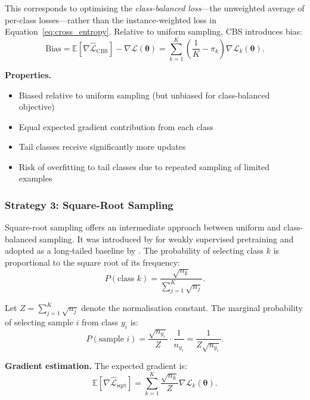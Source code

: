 \documentclass[12pt,a4paper]{article}
\newcommand{\E}{\mathbb{E}}
\newcommand{\btheta}{\boldsymbol{\theta}}
\begin{document}
This corresponds to optimising the \textit{class-balanced loss}---the unweighted average of per-class losses---rather than the instance-weighted loss in Equation~\eqref{eq:cross_entropy}. Relative to uniform sampling, CBS introduces bias:
\begin{equation}
    \text{Bias} = \E[\nabla \hat{\mathcal{L}}_{\text{CBS}}] - \nabla \mathcal{L}(\btheta) = \sum_{k=1}^{K} \left( \frac{1}{K} - \pi_k \right) \nabla \mathcal{L}_k(\btheta).
    \label{eq:cbs_bias}
\end{equation}

\textbf{Properties.}
\begin{itemize}[leftmargin=*]
    \item Biased relative to uniform sampling (but unbiased for class-balanced objective)
    \item Equal expected gradient contribution from each class
    \item Tail classes receive significantly more updates
    \item Risk of overfitting to tail classes due to repeated sampling of limited examples
\end{itemize}


\subsubsection{Strategy 3: Square-Root Sampling}
\label{subsec:sqrt_sampling}
Square-root sampling offers an intermediate approach between uniform and class-balanced sampling. It was introduced by \citet{mahajan2018exploring} for weakly supervised pretraining and adopted as a long-tailed baseline by \citet{kang2020decoupling}. The probability of selecting class $k$ is proportional to the square root of its frequency:
\begin{equation}
    P(\text{class } k) = \frac{\sqrt{n_k}}{\sum_{j=1}^{K} \sqrt{n_j}}.
    \label{eq:sqrt_class_prob}
\end{equation}

Let $Z = \sum_{j=1}^{K} \sqrt{n_j}$ denote the normalisation constant. The marginal probability of selecting sample $i$ from class $y_i$ is:
\begin{equation}
    P(\text{sample } i) = \frac{\sqrt{n_{y_i}}}{Z} \cdot \frac{1}{n_{y_i}} = \frac{1}{Z \sqrt{n_{y_i}}}.
    \label{eq:sqrt_marginal}
\end{equation}

\textbf{Gradient estimation.} The expected gradient is:
\begin{equation}
    \E[\nabla \hat{\mathcal{L}}_{\text{sqrt}}] = \sum_{k=1}^{K} \frac{\sqrt{n_k}}{Z} \nabla \mathcal{L}_k(\btheta).
    \label{eq:sqrt_gradient}
\end{equation}
\end{document}
